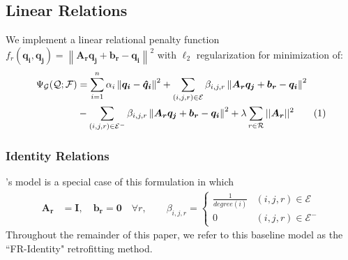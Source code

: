 \documentclass[11pt, a4paper]{article}
\newcommand\numberthis{\addtocounter{equation}{1}\tag{\theequation}}
\newcommand{\norm}[1]{\left\lVert#1\right\rVert}
\begin{document}

\subsection{Linear Relations}
We implement a linear relational penalty function $f_r(\boldsymbol{q_i}, \boldsymbol{q_j})=\norm{\boldsymbol{A_r}\boldsymbol{q_j} + \boldsymbol{b_r} - \boldsymbol{q_i}}^2 $
with $\ell_2$ regularization for minimization of:
\begin{align*}
\Psi_{\mathcal{G}}(\mathcal{Q}; \mathcal{F}) &= \sum_{i=1}^n\alpha_i\norm{\boldsymbol{q_i} - \boldsymbol{\hat{q}_i}}^2 + \sum_{(i,j,r)\in \mathcal{E}}\beta_{i,j,r}\norm{\boldsymbol{A_r}\boldsymbol{q_j} + \boldsymbol{b_r} - \boldsymbol{q_i}}^2 \\
&- \sum_{(i,j,r)\in \mathcal{E}^-}\beta_{i,j,r}\norm{\boldsymbol{A_r}\boldsymbol{q_j} + \boldsymbol{b_r} - \boldsymbol{q_i}}^2 + \lambda\sum_{r\in\mathcal{R}}||\boldsymbol{A_r}||^2\numberthis{}
\label{eq:linear_loss}
\end{align*}
\subsubsection*{Identity Relations}
's model is a special case of this formulation in which
\begin{align*}
\boldsymbol{A_r} &= \boldsymbol{I},\quad\boldsymbol{b_r} =\boldsymbol{0}\quad\forall r, \quad\quad \beta_{i,j,r} = \begin{cases} \frac{1}{\mathit{degree}(i)} & (i,j,r)\in \mathcal{E} \\
0 & (i,j,r) \in \mathcal{E}^-
\end{cases}
\end{align*}
Throughout the remainder of this paper, we refer to this baseline model as the ``FR-Identity" retrofitting method.
\end{document}
